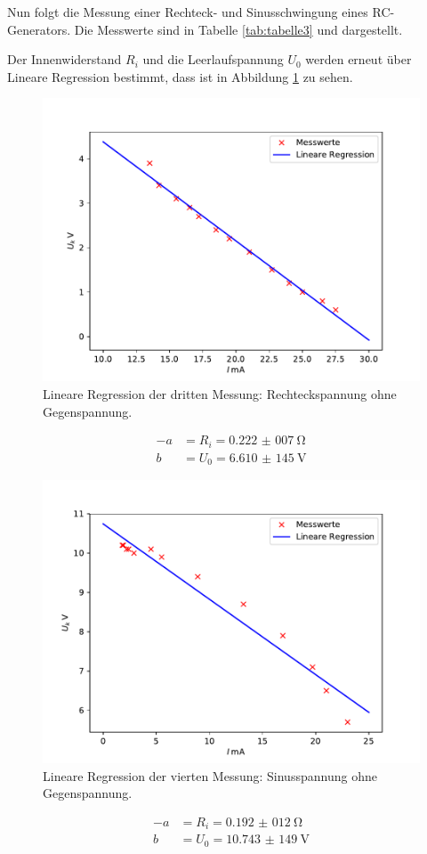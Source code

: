 \noindent Nun folgt die Messung einer Rechteck- und Sinusschwingung eines RC-Generators.
Die Messwerte sind in Tabelle \ref{tab:tabelle3} und dargestellt.

\noindent Der Innenwiderstand $R_{i}$ und die Leerlaufspannung $U_{0}$ werden erneut über Lineare Regression
bestimmt, dass ist in Abbildung \ref{fig:plot3} zu sehen.
\begin{figure}[H]
  \centering
  \includegraphics{plot3.pdf}
  \caption{Lineare Regression der dritten Messung: Rechteckspannung ohne Gegenspannung.}
  \label{fig:plot3}
\end{figure}
\begin{align*}
  -a &= R_{i} = \SI{0,222(007)}{\ohm} \\
  b &= U_{0} = \SI{6,610(145)}{\volt}
\end{align*}

\begin{figure}[H]
  \centering
  \includegraphics{plot4.pdf}
  \caption{Lineare Regression der vierten Messung: Sinusspannung ohne Gegenspannung.}
  \label{fig:plot4}
\end{figure}
\begin{align*}
  -a &= R_{i} = \SI{0,192(012)}{\ohm} \\
  b &= U_{0} = \SI{10,743(149)}{\volt}
\end{align*}


